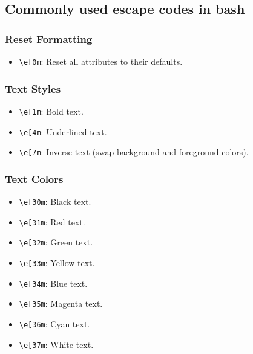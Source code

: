 \documentclass{report}
\begin{document}
\bigbreak \noindent 
\subsection{Commonly used escape codes in bash}

\subsubsection{Reset Formatting}
\begin{itemize}
    \item \texttt{\textbackslash e[0m}: Reset all attributes to their defaults.
\end{itemize}

\subsubsection{Text Styles}
\begin{itemize}
    \item \texttt{\textbackslash e[1m}: Bold text.
    \item \texttt{\textbackslash e[4m}: Underlined text.
    \item \texttt{\textbackslash e[7m}: Inverse text (swap background and foreground colors).
\end{itemize}

\subsubsection{Text Colors}
\begin{itemize}
    \item \texttt{\textbackslash e[30m}: Black text.
    \item \texttt{\textbackslash e[31m}: Red text.
    \item \texttt{\textbackslash e[32m}: Green text.
    \item \texttt{\textbackslash e[33m}: Yellow text.
    \item \texttt{\textbackslash e[34m}: Blue text.
    \item \texttt{\textbackslash e[35m}: Magenta text.
    \item \texttt{\textbackslash e[36m}: Cyan text.
    \item \texttt{\textbackslash e[37m}: White text.
\end{itemize}
\end{document}

